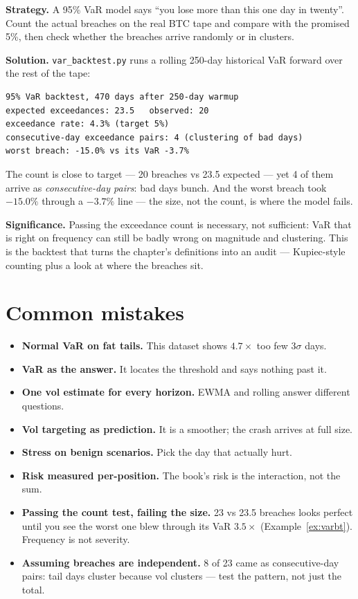 \begin{example}\label{ex:varbt}
\textbf{Strategy.} A 95\% VaR model says ``you lose more than
this one day in twenty''. Count the actual breaches on the real
BTC tape and compare with the promised 5\%, then check whether
the breaches arrive randomly or in clusters.

\textbf{Solution.} \texttt{var\_backtest.py} runs a rolling
250-day historical VaR forward over the rest of the tape:
\begin{verbatim}
95% VaR backtest, 470 days after 250-day warmup
expected exceedances: 23.5   observed: 20
exceedance rate: 4.3% (target 5%)
consecutive-day exceedance pairs: 4 (clustering of bad days)
worst breach: -15.0% vs its VaR -3.7%
\end{verbatim}
The count is close to target --- 20 breaches vs 23.5 expected ---
yet 4 of them arrive as \emph{consecutive-day pairs}: bad days
bunch. And the worst breach took $-15.0\%$ through a $-3.7\%$
line --- the size, not the count, is where the model fails.

\textbf{Significance.} Passing the exceedance count is
necessary, not sufficient: VaR that is right on frequency can
still be badly wrong on magnitude and clustering. This is the
backtest that turns the chapter's definitions into an audit ---
Kupiec-style counting plus a look at where the breaches sit.
\end{example}

\section{Common mistakes}
\begin{itemize}
\item \textbf{Normal VaR on fat tails.} This dataset shows $4.7\times$ too few $3\sigma$
  days.
\item \textbf{VaR as the answer.} It locates the threshold and says nothing past it.
\item \textbf{One vol estimate for every horizon.} EWMA and rolling answer different
  questions.
\item \textbf{Vol targeting as prediction.} It is a smoother; the crash arrives at full
  size.
\item \textbf{Stress on benign scenarios.} Pick the day that actually hurt.
\item \textbf{Risk measured per-position.} The book's risk is the interaction, not the sum.
\item \textbf{Passing the count test, failing the size.}
23 vs 23.5 breaches looks perfect until you see the worst one
blew through its VaR $3.5\times$
(Example~\ref{ex:varbt}). Frequency is not severity.
\item \textbf{Assuming breaches are independent.} 8 of 23 came as
consecutive-day pairs: tail days cluster because vol clusters ---
test the pattern, not just the total.\end{itemize}

